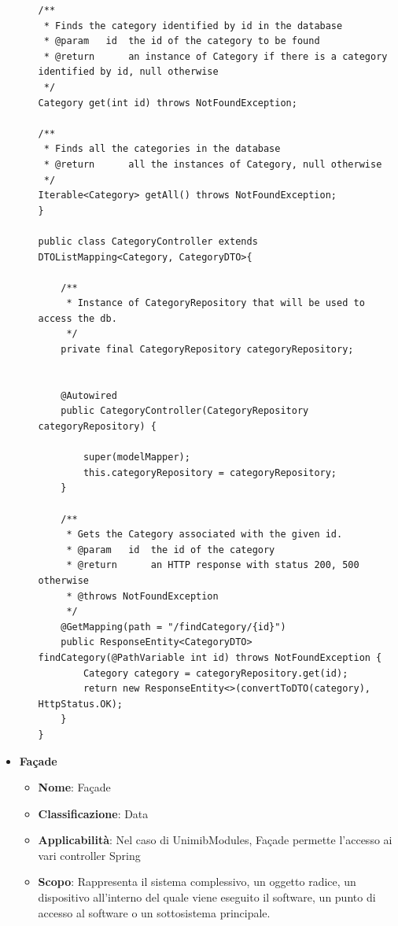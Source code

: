 \documentclass[12pt]{article}
\begin{document}
\begin{itemize}
\begin{itemize}
\begin{lstlisting}
/**
 * Finds the category identified by id in the database
 * @param   id  the id of the category to be found
 * @return      an instance of Category if there is a category identified by id, null otherwise
 */
Category get(int id) throws NotFoundException;

/**
 * Finds all the categories in the database
 * @return      all the instances of Category, null otherwise
 */
Iterable<Category> getAll() throws NotFoundException;
}

public class CategoryController extends DTOListMapping<Category, CategoryDTO>{

    /**
     * Instance of CategoryRepository that will be used to access the db.
     */
    private final CategoryRepository categoryRepository;


    @Autowired
    public CategoryController(CategoryRepository categoryRepository) {

        super(modelMapper);
        this.categoryRepository = categoryRepository;
    }

    /**
     * Gets the Category associated with the given id.
     * @param	id	the id of the category
     * @return		an HTTP response with status 200, 500 otherwise
     * @throws NotFoundException 
     */
    @GetMapping(path = "/findCategory/{id}")
    public ResponseEntity<CategoryDTO> findCategory(@PathVariable int id) throws NotFoundException {
        Category category = categoryRepository.get(id);
        return new ResponseEntity<>(convertToDTO(category), HttpStatus.OK);
    }
}
            \end{lstlisting}
        \end{itemize}
		
		\item \textbf{Façade}
		\begin{itemize}
		\item \textbf{Nome}: Façade
            \item \textbf{Classificazione}: Data
            \item \textbf{Applicabilità}: Nel caso di UnimibModules, Façade permette l'accesso ai vari controller Spring
            \item \textbf{Scopo}: Rappresenta il sistema complessivo, un oggetto radice, un dispositivo all’interno del quale viene eseguito il software, un punto di accesso al software o un sottosistema principale.
        \end{itemize}
	\end{itemize}
	
\end{document}
